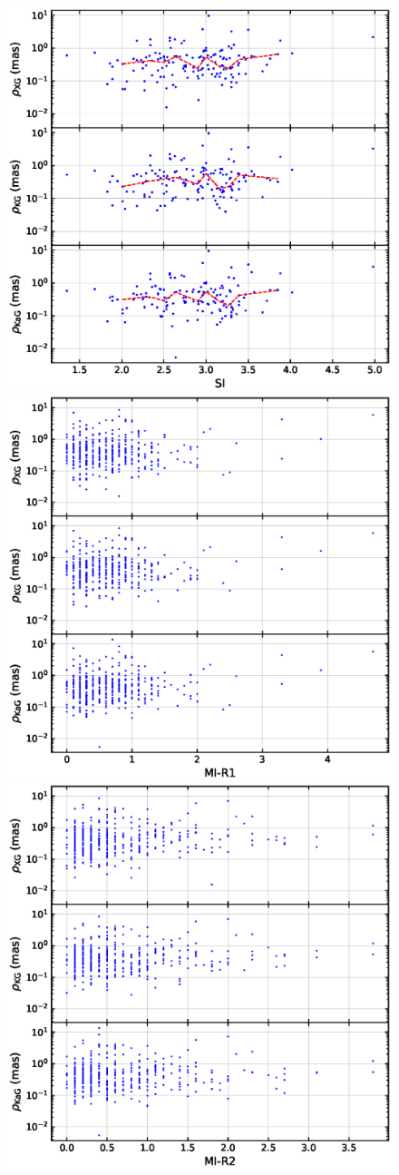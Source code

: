 \documentclass{aa}
\begin{document}
    \begin{figure}[hbtp]
        \centering
        \includegraphics[width=0.7\columnwidth]{figs/rho-si}
        \includegraphics[width=0.7\columnwidth]{figs/rho-I1R}
        \includegraphics[width=0.7\columnwidth]{figs/rho-I2R}

\end{figure}
\end{document}

